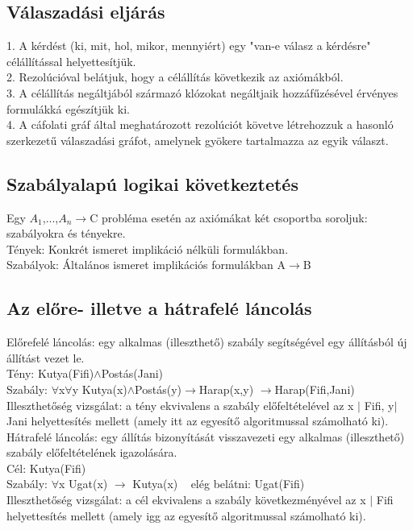 \documentclass{article}
\begin{document}
	 \subsection{Válaszadási eljárás}
	 1. A kérdést (ki, mit, hol, mikor, mennyiért) egy "van-e válasz a kérdésre" célállítással helyettesítjük.\\
	 2. Rezolúcióval belátjuk, hogy a célállítás következik az axiómákból.\\
	 3. A célállítás negáltjából származó klózokat negáltjaik hozzáfűzésével érvényes formulákká egészítjük ki.\\
	 4. A cáfolati gráf által meghatározott rezolúciót követve létrehozzuk a hasonló szerkezetű válaszadási gráfot, amelynek gyökere tartalmazza az egyik választ.\\
	 
	 \subsection{Szabályalapú logikai következtetés}
	 Egy $A_1$,...,$A_n$$\rightarrow$C probléma esetén az axiómákat két csoportba soroljuk: szabályokra és tényekre.\\
	 Tények: Konkrét ismeret implikáció nélküli formulákban.\\
	 Szabályok: Általános ismeret implikációs formulákban A$\rightarrow$B
	 
	 \subsection{Az előre- illetve a hátrafelé láncolás}
	 Előrefelé láncolás: egy alkalmas (illeszthető) szabály segítségével egy állításból új állítást vezet le.\\
	 Tény: Kutya(Fifi)$\wedge$Postás(Jani)\\
	 Szabály: $\forall$x$\forall$y Kutya(x)$\wedge$Postás(y)$\rightarrow$Harap(x,y) $\rightarrow$Harap(Fifi,Jani)\\
	 Illeszthetőség vizsgálat: a tény ekvivalens a szabály előfeltételével az {x $|$ Fifi, y$|$ Jani} helyettesítés mellett (amely itt az egyesítő algoritmussal számolható ki).\\
	 Hátrafelé láncolás: egy állítás bizonyítását visszavezeti egy alkalmas (illeszthető) szabály előfeltételének igazolására.\\
	 Cél: Kutya(Fifi)\\
	 Szabály: $\forall$x Ugat(x) $\rightarrow$ Kutya(x) ~ elég belátni: Ugat(Fifi)\\
	 Illeszthetőség vizsgálat: a cél ekvivalens a szabály következményével az {x $|$ Fifi} helyettesítés mellett (amely igg az egyesítő algoritmussal számolható ki).\\
	 
\end{document}
